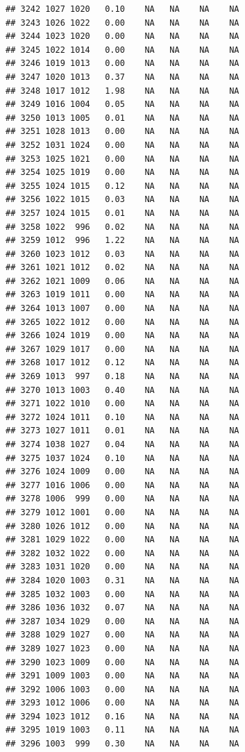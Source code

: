 \documentclass{article}\usepackage{graphicx, color}
\makeatletter
\newenvironment{kframe}{%
 \def\at@end@of@kframe{}%
 \ifinner\ifhmode%
  \def\at@end@of@kframe{\end{minipage}}%
  \begin{minipage}{\columnwidth}%
 \fi\fi%
 \def\FrameCommand##1{\hskip\@totalleftmargin \hskip-\fboxsep
 \colorbox{shadecolor}{##1}\hskip-\fboxsep
     \hskip-\linewidth \hskip-\@totalleftmargin \hskip\columnwidth}%
 \MakeFramed {\advance\hsize-\width
   \@totalleftmargin\z@ \linewidth\hsize
   \@setminipage}}%
 {\par\unskip\endMakeFramed%
 \at@end@of@kframe}
\newenvironment{knitrout}{}{} %
\makeatother
\begin{document}
\begin{knitrout}
\begin{kframe}
\begin{verbatim}
## 3242 1027 1020   0.10    NA   NA    NA    NA
## 3243 1026 1022   0.00    NA   NA    NA    NA
## 3244 1023 1020   0.00    NA   NA    NA    NA
## 3245 1022 1014   0.00    NA   NA    NA    NA
## 3246 1019 1013   0.00    NA   NA    NA    NA
## 3247 1020 1013   0.37    NA   NA    NA    NA
## 3248 1017 1012   1.98    NA   NA    NA    NA
## 3249 1016 1004   0.05    NA   NA    NA    NA
## 3250 1013 1005   0.01    NA   NA    NA    NA
## 3251 1028 1013   0.00    NA   NA    NA    NA
## 3252 1031 1024   0.00    NA   NA    NA    NA
## 3253 1025 1021   0.00    NA   NA    NA    NA
## 3254 1025 1019   0.00    NA   NA    NA    NA
## 3255 1024 1015   0.12    NA   NA    NA    NA
## 3256 1022 1015   0.03    NA   NA    NA    NA
## 3257 1024 1015   0.01    NA   NA    NA    NA
## 3258 1022  996   0.02    NA   NA    NA    NA
## 3259 1012  996   1.22    NA   NA    NA    NA
## 3260 1023 1012   0.03    NA   NA    NA    NA
## 3261 1021 1012   0.02    NA   NA    NA    NA
## 3262 1021 1009   0.06    NA   NA    NA    NA
## 3263 1019 1011   0.00    NA   NA    NA    NA
## 3264 1013 1007   0.00    NA   NA    NA    NA
## 3265 1022 1012   0.00    NA   NA    NA    NA
## 3266 1024 1019   0.00    NA   NA    NA    NA
## 3267 1029 1017   0.00    NA   NA    NA    NA
## 3268 1017 1012   0.12    NA   NA    NA    NA
## 3269 1013  997   0.18    NA   NA    NA    NA
## 3270 1013 1003   0.40    NA   NA    NA    NA
## 3271 1022 1010   0.00    NA   NA    NA    NA
## 3272 1024 1011   0.10    NA   NA    NA    NA
## 3273 1027 1011   0.01    NA   NA    NA    NA
## 3274 1038 1027   0.04    NA   NA    NA    NA
## 3275 1037 1024   0.10    NA   NA    NA    NA
## 3276 1024 1009   0.00    NA   NA    NA    NA
## 3277 1016 1006   0.00    NA   NA    NA    NA
## 3278 1006  999   0.00    NA   NA    NA    NA
## 3279 1012 1001   0.00    NA   NA    NA    NA
## 3280 1026 1012   0.00    NA   NA    NA    NA
## 3281 1029 1022   0.00    NA   NA    NA    NA
## 3282 1032 1022   0.00    NA   NA    NA    NA
## 3283 1031 1020   0.00    NA   NA    NA    NA
## 3284 1020 1003   0.31    NA   NA    NA    NA
## 3285 1032 1003   0.00    NA   NA    NA    NA
## 3286 1036 1032   0.07    NA   NA    NA    NA
## 3287 1034 1029   0.00    NA   NA    NA    NA
## 3288 1029 1027   0.00    NA   NA    NA    NA
## 3289 1027 1023   0.00    NA   NA    NA    NA
## 3290 1023 1009   0.00    NA   NA    NA    NA
## 3291 1009 1003   0.00    NA   NA    NA    NA
## 3292 1006 1003   0.00    NA   NA    NA    NA
## 3293 1012 1006   0.00    NA   NA    NA    NA
## 3294 1023 1012   0.16    NA   NA    NA    NA
## 3295 1019 1003   0.11    NA   NA    NA    NA
## 3296 1003  999   0.30    NA   NA    NA    NA

\end{verbatim}
\end{kframe}
\end{knitrout}
\end{document}
